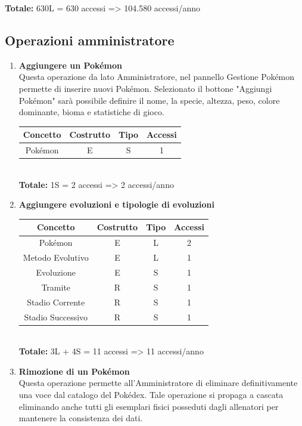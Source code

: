 \documentclass[a4paper,12pt]{report}
\begin{document}
\begin{enumerate}
  \textbf{Totale:} 630L = 630 accessi => 104.580 accessi/anno

\end{enumerate}

\subsection{Operazioni amministratore}

\begin{enumerate}
  \item \textbf{Aggiungere un Pokémon} \\
  Questa operazione da lato Amministratore, nel pannello Gestione Pokémon permette di inserire nuovi Pokémon.
  Selezionato il bottone "Aggiungi Pokémon" sarà possibile definire il nome, la specie, altezza, peso, colore dominante, bioma e statistiche di gioco.
  
  \begin{tabular}{|c|c|c|c|}
  	\hline
  	\rowcolor{gray!30}Concetto & Costrutto & Tipo & Accessi \\
  	\hline
    Pokémon & E & S & 1 \\
    \hline
  \end{tabular} \\
  
  \textbf{Totale:} 1S = 2 accessi => 2 accessi/anno
  
  \item \textbf{Aggiungere evoluzioni e tipologie di evoluzioni}
  
  \begin{tabular}{|c|c|c|c|}
  	\hline
  	\rowcolor{gray!30}Concetto & Costrutto & Tipo & Accessi \\
  	\hline
    Pokémon & E & L & 2 \\
    \hline
    Metodo Evolutivo & E & L & 1 \\
  	\hline
    Evoluzione & E & S & 1 \\
    \hline
    Tramite & R & S & 1 \\
  	\hline
    Stadio Corrente & R & S & 1 \\
  	\hline
    Stadio Successivo & R & S & 1 \\
    \hline
  \end{tabular} \\
  
  \textbf{Totale:} 3L + 4S = 11 accessi => 11 accessi/anno
  
  \item \textbf{Rimozione di un Pokémon} \\
  Questa operazione permette all'Amministratore di eliminare definitivamente una voce dal catalogo del Pokédex. Tale operazione si propaga a cascata eliminando anche tutti gli esemplari fisici posseduti dagli allenatori per mantenere la consistenza dei dati.
  

\end{enumerate}
\end{document}
